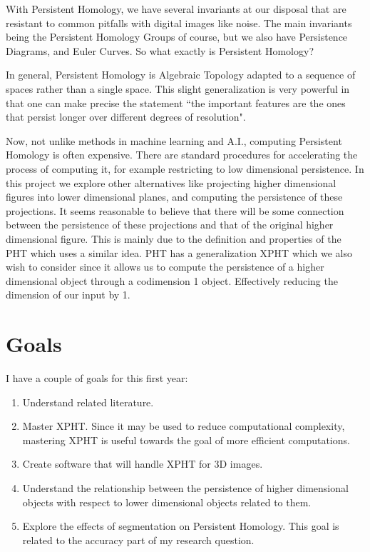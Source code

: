 \documentclass[12pt]{article}
\theoremstyle{theorem}
\theoremstyle{definition}
\theoremstyle{remark}
\theoremstyle{gremark}
\theoremstyle{discussion}
\theoremstyle{notation}
\begin{document}
	
		 With Persistent Homology, we have several invariants at our disposal that are resistant to common pitfalls with digital images like noise. The main invariants being the Persistent Homology Groups of course, but we also have Persistence Diagrams, and Euler Curves. So what exactly is Persistent Homology?
		 
		 In general, Persistent Homology is Algebraic Topology adapted to a sequence of spaces rather than a single space. This slight generalization is very powerful in that one can make precise the statement ``the important features are the ones that persist longer over different degrees of resolution". 
		 
		 Now, not unlike methods in machine learning and A.I., computing Persistent Homology is often expensive. There are standard procedures for accelerating the process of computing it, for example restricting to low dimensional persistence. In this project we explore other alternatives like projecting higher dimensional figures into lower dimensional planes, and computing the persistence of these projections. It seems reasonable to believe that there will be some connection between the persistence of these projections and that of the original higher dimensional figure. This is mainly due to the definition and properties of the PHT \cite{turner2014persistenthomologytransformmodeling} which uses a similar idea. PHT has a generalization XPHT \cite{turner_extended_2024} which we also wish to consider since it allows us to compute the persistence of a higher dimensional object through a codimension 1 object. Effectively reducing the dimension of our input by 1.
	
	
	\section*{Goals}
	
	I have a couple of goals for this first year:

		\begin{enumerate}
			\item Understand related literature.
			\item Master XPHT. Since it may be used to reduce computational complexity, mastering XPHT is useful towards the goal of more efficient computations.
			\item Create software that will handle XPHT for 3D images. 
			\item Understand the relationship between the persistence of higher dimensional objects with respect to lower dimensional objects related to them. 
			\item Explore the effects of segmentation on Persistent Homology. This goal is related to the accuracy part of my research question.
		\end{enumerate}
	
\end{document}
